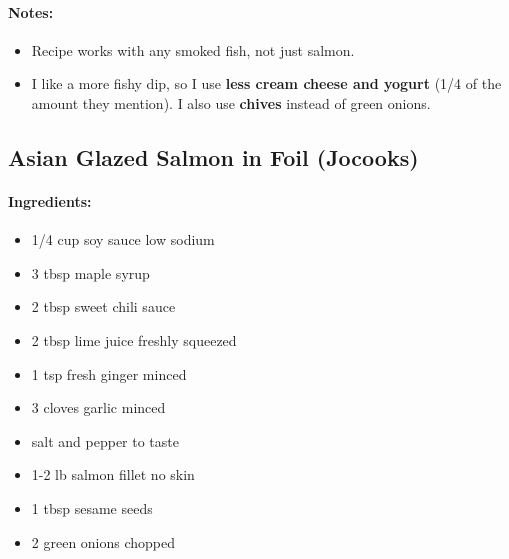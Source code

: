 \documentclass{article}
\begin{document}
\paragraph{Notes:}
\begin{itemize}
    \item Recipe works with any smoked fish, not just salmon.
    \item I like a more fishy dip, so I use \textbf{less cream cheese and yogurt} (1/4 of the amount they mention). I also use \textbf{chives} instead of green onions.
\end{itemize}

\subsection{Asian Glazed Salmon in Foil (Jocooks)}

\paragraph{Ingredients:}
\begin{itemize}
    \item 1/4 cup soy sauce low sodium
    \item 3 tbsp maple syrup
    \item 2 tbsp sweet chili sauce
    \item 2 tbsp lime juice freshly squeezed
    \item 1 tsp fresh ginger minced
    \item 3 cloves garlic minced
    \item salt and pepper to taste
    \item 1-2 lb salmon fillet no skin
    \item 1 tbsp sesame seeds
    \item 2 green onions chopped
\end{itemize}
\end{document}

